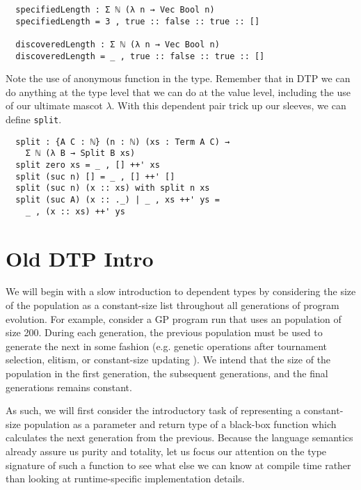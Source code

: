 \documentclass{acm_proc_article-sp}
\begin{document}
\begin{verbatim}
  specifiedLength : Σ ℕ (λ n → Vec Bool n)
  specifiedLength = 3 , true :: false :: true :: []

  discoveredLength : Σ ℕ (λ n → Vec Bool n)
  discoveredLength = _ , true :: false :: true :: []
\end{verbatim}

Note the use of anonymous function in the type. Remember that in DTP
we can do anything at the type level that we can do at the value
level, including the use of our ultimate mascot $\lambda$. With this
dependent pair trick up our sleeves, we can define \texttt{split}.

\begin{verbatim}
  split : {A C : ℕ} (n : ℕ) (xs : Term A C) →
    Σ ℕ (λ B → Split B xs)
  split zero xs = _ , [] ++' xs
  split (suc n) [] = _ , [] ++' []
  split (suc n) (x :: xs) with split n xs
  split (suc A) (x :: ._) | _ , xs ++' ys =
    _ , (x :: xs) ++' ys
\end{verbatim}

\section{Old DTP Intro}

We will begin with a slow introduction to dependent types by
considering the size of the population as a constant-size list
throughout all generations of program evolution. For example, consider
a GP program run that uses an population of size 200. During each
generation, the previous population must be used to generate the next
in some fashion (e.g. genetic operations after tournament selection,
elitism, or constant-size updating \cite{montana:strongtree}). We
intend that the size of the population in the first generation, the
subsequent generations, and the final generations remains
constant.


As such, we will first consider the introductory task of representing
a constant-size population as a parameter and return type of a
black-box function which calculates the next generation from the
previous. Because the language semantics already assure us purity and
totality, let us focus our attention on the type signature of such a
function to see what else we can know at compile time rather than
looking at runtime-specific implementation details.
\end{document}
